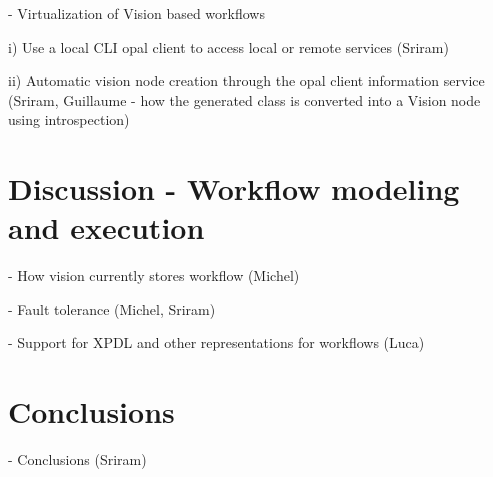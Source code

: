 \documentclass[conference]{IEEEtran}
\begin{document}
- Virtualization of Vision based workflows

  i) Use a local CLI opal client to access local or remote services (Sriram)

 ii) Automatic vision node creation through the opal client information
 service (Sriram, Guillaume - how the generated class is converted into a Vision node using introspection)

\section {Discussion - Workflow modeling and execution}

- How vision currently stores workflow (Michel)

- Fault tolerance (Michel, Sriram)

- Support for XPDL and other representations for workflows (Luca)

\section {Conclusions}

- Conclusions (Sriram)




\end{document}

